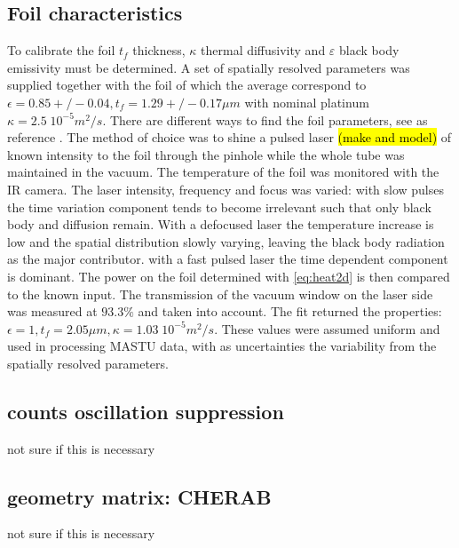\subsection{Foil characteristics}
To calibrate the foil $t_f$ thickness, $\kappa$ thermal diffusivity and $\varepsilon$ black body emissivity must be determined. A set of spatially resolved parameters was supplied together with the foil of which the average correspond to $\epsilon=0.85+/-0.04, t_f=1.29+/-0.17 \mu m$ with nominal platinum $\kappa=2.5\;10^{-5}m^2/s$. There are different ways to find the foil parameters, see as reference \cite{Itomi2014,Cernuschi2001,Mukai2016}. The method of choice was to shine a pulsed laser \hl{(make and model)} of known intensity to the foil through the pinhole while the whole tube was maintained in the vacuum. The temperature of the foil was monitored with the IR camera. The laser intensity, frequency and focus was varied: with slow pulses the time variation component tends to become irrelevant such that only black body and diffusion remain. With a defocused laser the temperature increase is low and the spatial distribution slowly varying, leaving the black body radiation as the major contributor. with a fast pulsed laser the time dependent component is dominant. The power on the foil determined with \autoref{eq:heat2d} is then compared to the known input. The transmission of the vacuum window on the laser side was measured at $93.3\%$ and taken into account. The fit returned the properties: $\epsilon=1, t_f=2.05 \mu m, \kappa=1.03\;10^{-5}m^2/s$. These values were assumed uniform and used in processing MASTU data, with as uncertainties the variability from the spatially resolved parameters.
\subsection{counts oscillation suppression}
not sure if this is necessary
\subsection{geometry matrix: CHERAB}
not sure if this is necessary